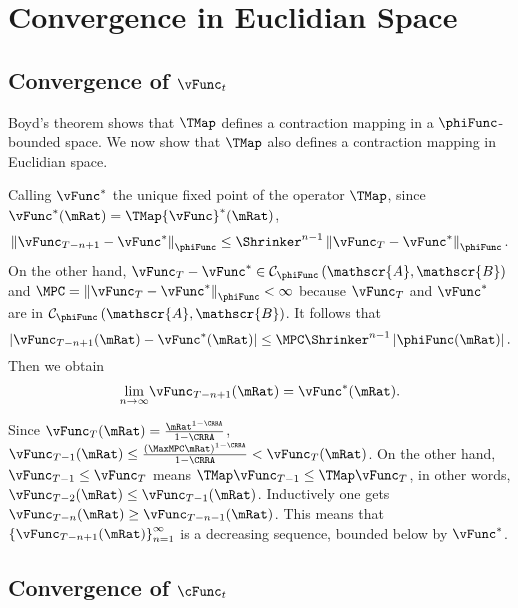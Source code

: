 \documentclass[\econtexRoot/ProjectMMD]{subfiles}
\begin{document}
\section{Convergence in Euclidian Space}
\subsection{Convergence of
  \texorpdfstring{$\vFunc_{t}$}{vFunc-{t}}}\label{sec:vEuclidian}

Boyd's theorem shows that $\TMap$ defines a contraction mapping
in a $\phiFunc$-bounded space. We now show that $\TMap$ also
defines a contraction mapping in Euclidian space.

Calling $\vFunc^{\ast}$ the unique fixed point of the operator $\TMap$, since $\vFunc^{\ast }(\mRat)=\TMap {\vFunc}^{\ast }(\mRat)$,
\begin{equation}
\left\Vert \vFunc_{T-n+1}-\vFunc^{\ast }\right\Vert _{\phiFunc }\leq \Shrinker
^{n-1}\left\Vert \vFunc_{T}-\vFunc^{\ast }\right\Vert _{\phiFunc }.
\end{equation}%
On the other hand, $\vFunc_{T}-\vFunc^{\ast }\in \mathcal{C}_{\phiFunc }\left( \mathscr{A},
\mathscr{B}\right) $ and $\MPC =\left\Vert \vFunc_{T}-\vFunc^{\ast }\right\Vert_{\phiFunc }<\infty $ because $\vFunc_{T}$ and $\vFunc^{\ast }$ are in $\mathcal{C}_{\phiFunc
}\left( \mathscr{A},\mathscr{B}\right) $. It follows that%
\begin{equation}
\left\vert \vFunc_{T-n+1}(\mRat)-\vFunc^{\ast }(\mRat)\right\vert \leq \MPC \Shrinker^{n-1}\left\vert \phiFunc(\mRat)\right\vert.
\end{equation}%
Then we obtain
\begin{equation}
\underset{n\rightarrow \infty }{\lim }\vFunc_{T-n+1}(\mRat)=\vFunc^{\ast }(\mRat).
\end{equation}

Since $\vFunc_{T}(\mRat)=\frac{\mRat^{1-\CRRA }}{1-\CRRA }$, $\vFunc_{T-1}(\mRat)\leq \frac{{\left(\MaxMPC \mRat\right)}^{1-\CRRA}}{1-\CRRA}<\vFunc_{T}(\mRat)$. On the other hand, $\vFunc_{T-1}\leq \vFunc_{T}$
means $\TMap\vFunc_{T-1}\leq \TMap\vFunc_{T}$, in other words, $\vFunc_{T-2}(\mRat)\leq \vFunc_{T-1}(\mRat)$.
Inductively one gets $\vFunc_{T-n}(\mRat)\geq \vFunc_{T-n-1}(\mRat)$. This means that $\left\{
\vFunc_{T-n+1}(\mRat)\right\} _{n=1}^{\infty }$ is a decreasing sequence,
bounded below by $\vFunc^{\ast}$.


\subsection{Convergence of
  \texorpdfstring{$\cFunc_{t}$}{cFunc-{t}}}\label{subsec:cConverges}%
\end{document}
